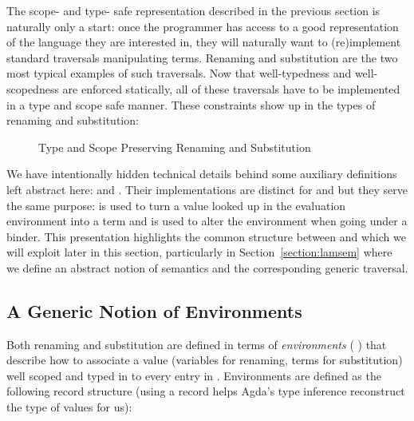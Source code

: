 The scope- and type- safe representation described in the previous section is
naturally only a start: once the programmer has access to a good
representation of the language they are interested in, they will naturally
want to (re)implement standard traversals manipulating terms.
Renaming and substitution are the two most typical examples
of such traversals. Now that well-typedness and well-scopedness are enforced
statically, all of these traversals have to be implemented
in a type and scope safe manner.
These constraints show up in the types of renaming and substitution: %

\begin{figure}[h]
\begin{minipage}{0.50\textwidth}
\end{minipage}\hfill
\begin{minipage}{0.50\textwidth}
\end{minipage}
\caption{Type and Scope Preserving Renaming and Substitution}
\end{figure}

We have intentionally hidden technical details behind some auxiliary definitions
left abstract here:  and . Their implementations are distinct
for  and  but they serve the same purpose:  is used to
turn a value looked up in the evaluation environment into a term and 
is used to alter the environment when going under a binder. This presentation
highlights the common structure between  and  which we will exploit
later in this section, particularly in Section~\ref{section:lamsem}
where we define an abstract notion of semantics and the corresponding generic traversal.

\subsection{A Generic Notion of Environments}

Both renaming and substitution are defined in terms of \emph{environments}
{( )  } that describe how to associate a value 
(variables for renaming, terms for substitution) well scoped and typed in 
to every entry in . Environments are defined as the following record
structure (using a record helps Agda's type inference reconstruct the type of
values  for us):

\begin{center}
\end{center}

